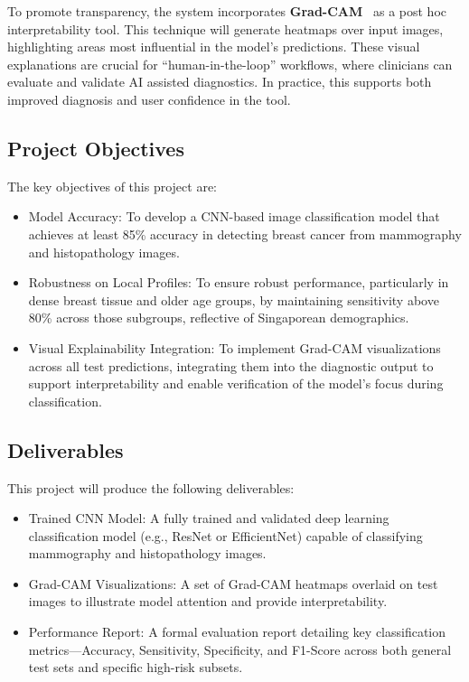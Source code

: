 \documentclass[12pt]{article}
\begin{document}
To promote transparency, the system incorporates \textbf{Grad-CAM}~\cite{5} as a post hoc interpretability tool. This technique will generate heatmaps over input images, highlighting areas most influential in the model’s predictions. These visual explanations are crucial for ``human-in-the-loop'' workflows, where clinicians can evaluate and validate AI assisted diagnostics. In practice, this supports both improved diagnosis and user confidence in the tool.

\subsection{Project Objectives}
\label{sec:objectives}
The key objectives of this project are:
\begin{itemize}
    \item {Model Accuracy:} To develop a CNN-based image classification model that achieves at least {85\% accuracy} in detecting breast cancer from mammography and histopathology images.
    \item {Robustness on Local Profiles:} To ensure robust performance, particularly in {dense breast tissue and older age groups}, by maintaining {sensitivity above 80\%} across those subgroups, reflective of Singaporean demographics.
    \item {Visual Explainability Integration:} To implement {Grad-CAM visualizations} across all test predictions, integrating them into the diagnostic output to support interpretability and enable verification of the model’s focus during classification.
\end{itemize}

\subsection{Deliverables}
This project will produce the following deliverables:
\begin{itemize}
    \item {Trained CNN Model:} A fully trained and validated deep learning classification model (e.g., ResNet or EfficientNet) capable of classifying mammography and histopathology images.
    \item {Grad-CAM Visualizations:} A set of Grad-CAM heatmaps overlaid on test images to illustrate model attention and provide interpretability.
    \item {Performance Report:} A formal evaluation report detailing key classification metrics—{Accuracy, Sensitivity, Specificity, and F1-Score} across both general test sets and specific high-risk subsets.
\end{itemize}
\newpage
\end{document}
